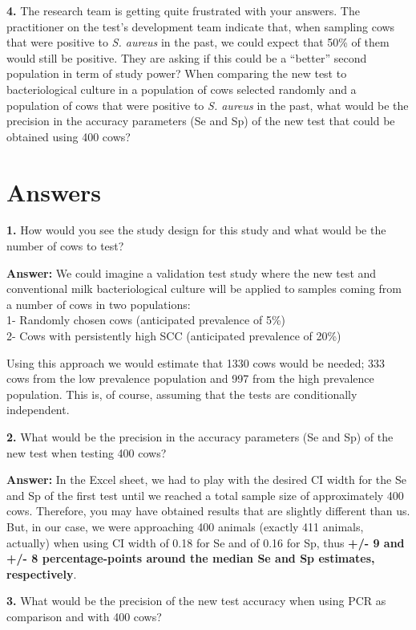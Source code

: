 \documentclass[
]{book}
\begin{document}
\textbf{4.} The research team is getting quite frustrated with your answers. The practitioner on the test's development team indicate that, when sampling cows that were positive to \emph{S. aureus} in the past, we could expect that 50\% of them would still be positive. They are asking if this could be a ``better'' second population in term of study power? When comparing the new test to bacteriological culture in a population of cows selected randomly and a population of cows that were positive to \emph{S. aureus} in the past, what would be the precision in the accuracy parameters (Se and Sp) of the new test that could be obtained using 400 cows?

\section{Answers}\label{answers-5}

\textbf{1.} How would you see the study design for this study and what would be the number of cows to test?

\textbf{Answer:} We could imagine a validation test study where the new test and conventional milk bacteriological culture will be applied to samples coming from a number of cows in two populations:\\
1- Randomly chosen cows (anticipated prevalence of 5\%)\\
2- Cows with persistently high SCC (anticipated prevalence of 20\%)

Using this approach we would estimate that 1330 cows would be needed; 333 cows from the low prevalence population and 997 from the high prevalence population. This is, of course, assuming that the tests are conditionally independent.

\textbf{2.} What would be the precision in the accuracy parameters (Se and Sp) of the new test when testing 400 cows?

\textbf{Answer:} In the Excel sheet, we had to play with the desired CI width for the Se and Sp of the first test until we reached a total sample size of approximately 400 cows. Therefore, you may have obtained results that are slightly different than us. But, in our case, we were approaching 400 animals (exactly 411 animals, actually) when using CI width of 0.18 for Se and of 0.16 for Sp, thus \textbf{+/- 9 and +/- 8 percentage-points around the median Se and Sp estimates, respectively}.

\textbf{3.} What would be the precision of the new test accuracy when using PCR as comparison and with 400 cows?
\end{document}
